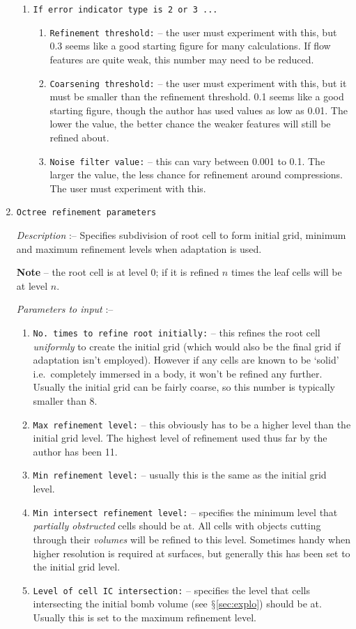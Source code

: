 \documentclass[pdftex, 12pt, a4paper]{report}
\begin{document}
\begin{enumerate}
\begin{enumerate}
    \item \verb'If error indicator type is 2 or 3 ...'
      \begin{enumerate}
	\item \verb'Refinement threshold:' -- the user must experiment with this, but 0.3 seems like a good starting figure for many
	  calculations.  If flow features are quite weak, this number may need to be reduced.
	\item \verb'Coarsening threshold:' -- the user must experiment with this, but it must be smaller than the 
	  refinement threshold.  0.1 seems like a good starting figure, though the author has used values as low as 0.01.  The
	  lower the value, the better chance the weaker features will still be refined about.
	\item \verb'Noise filter value:' -- this can vary between 0.001 to 0.1.  The larger the value, the less chance for refinement
	  around compressions.  The user must experiment with this.
      \end{enumerate}
\end{enumerate}

\item \verb'Octree refinement parameters'

\emph{Description} :-- Specifies subdivision of root cell to form initial grid, minimum and maximum refinement levels when adaptation
is used.  

\textbf{Note} -- the root cell is at level 0; if it is refined $n$ times the leaf cells will be at level $n$.

\emph{Parameters to input} :--
\begin{enumerate}
  \item \verb'No. times to refine root initially:' -- this refines the root cell \emph{uniformly} to create the initial grid (which
    would also be the final grid if adaptation isn't employed).  However if any cells are known
    to be `solid' i.e.\ completely immersed in a body, it won't be refined any further.  Usually the initial grid can be fairly 
    coarse, so this number is typically smaller than 8.
  \item \verb'Max refinement level:' -- this obviously has to be a higher level than the initial grid level.  The highest level
    of refinement used thus far by the author has been 11.
  \item \verb'Min refinement level:' -- usually this is the same as the initial grid level.
  \item \verb'Min intersect refinement level:' -- specifies the minimum level that \emph{partially obstructed} cells should be at.
    All cells with objects cutting through their \emph{volumes} will be refined to this level.  Sometimes handy when higher resolution
    is required at surfaces, but generally this has been set to the initial grid level.
  \item \verb'Level of cell IC intersection:' -- specifies the level that cells intersecting the initial bomb volume (see 
    $\mathsection$\ref{sec:explo}) should be at.  Usually this is set to the maximum refinement level.
\end{enumerate}


\end{enumerate}
\end{document}
